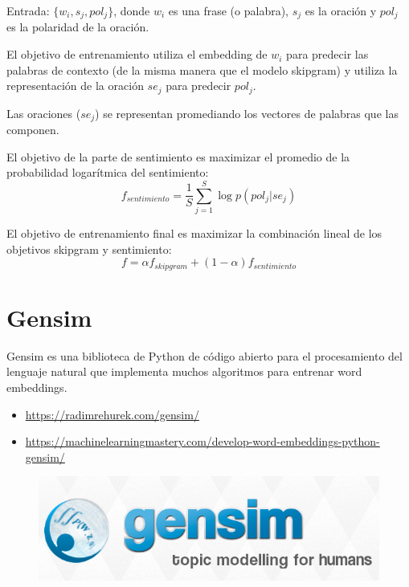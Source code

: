 Entrada: $\{w_i,s_j,pol_j\}$, donde $w_i$ es una frase (o palabra), $s_j$ es la oración y $pol_j$ es la polaridad de la oración.

El objetivo de entrenamiento utiliza el embedding de $w_i$ para predecir las palabras de contexto (de la misma manera que el modelo skipgram) y utiliza la representación de la oración $se_j$ para predecir $pol_j$.

Las oraciones ($se_j$) se representan promediando los vectores de palabras que las componen.

El objetivo de la parte de sentimiento es maximizar el promedio de la probabilidad logarítmica del sentimiento:
\begin{displaymath}
f_{sentimiento}= \frac{1}{S}\sum_{j=1}^{S}\log p(pol_j|se_j)
\end{displaymath}

El objetivo de entrenamiento final es maximizar la combinación lineal de los objetivos skipgram y sentimiento:
\begin{displaymath}
f = \alpha f_{skipgram} + (1- \alpha)f_{sentimiento}
\end{displaymath}

\section{Gensim}
Gensim es una biblioteca de Python de código abierto para el procesamiento del lenguaje natural que implementa muchos algoritmos para entrenar word embeddings.

\begin{itemize}
 \item \url{https://radimrehurek.com/gensim/}
  \item \url{https://machinelearningmastery.com/develop-word-embeddings-python-gensim/}
\end{itemize}

\begin{figure}[h]
	\centering
	\includegraphics[scale=0.3]{pics/gensim.png}
\end{figure}
